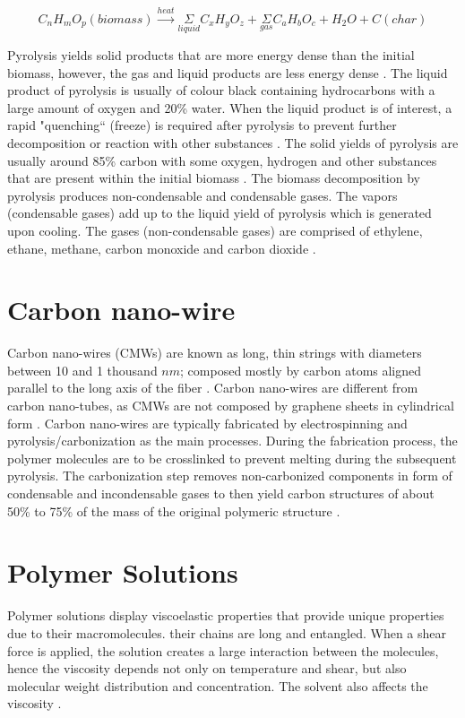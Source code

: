 \begin{equation}
C_{n} H_{m} O_{p} (biomass) \overset{heat}{\rightarrow} \underset{liquid}{\Sigma} C_{x} H_{y} O_{z} + \underset{gas}{\Sigma} C_{a} H_{b} O_{c} + H_{2} O + C (char)
\label{eq:genPyrolysis}
\end{equation}

Pyrolysis yields solid products that are more energy dense than the initial biomass, however, the gas and liquid products are less energy dense \cite{Basu2018}. The liquid product of pyrolysis is usually of colour black containing hydrocarbons with a large amount of oxygen and 20\% water. When the liquid product is of interest, a rapid "quenching`` (freeze) is required after pyrolysis to prevent further decomposition or reaction with other substances \cite{Basu2018}. The solid yields of pyrolysis are usually around 85\% carbon with some oxygen, hydrogen and other substances that are present within the initial biomass \cite{Basu2018}. The biomass decomposition by pyrolysis produces non-condensable and condensable gases. The vapors (condensable gases) add up to the liquid yield of pyrolysis which is generated upon cooling. The gases (non-condensable gases) are comprised of ethylene, ethane, methane, carbon monoxide and carbon dioxide \cite{Basu2018}.

\section{Carbon nano-wire}
Carbon nano-wires (CMWs) are known as long, thin strings with diameters between 10 and 1 thousand $n m$; composed mostly by carbon atoms aligned parallel to the long axis of the fiber \cite{Nataraj2012}. Carbon nano-wires are different from carbon nano-tubes, as CMWs are not composed by graphene sheets in cylindrical form \cite{Nataraj2012}. Carbon nano-wires are typically fabricated by electrospinning and pyrolysis/carbonization as the main processes. During the fabrication process, the polymer molecules are to be crosslinked to prevent melting during the subsequent pyrolysis. The carbonization step removes non-carbonized components in form of condensable and incondensable gases \cite{Basu2018} to then yield carbon structures of about 50\% to 75\% of the mass of the original polymeric structure \cite{Nataraj2012}.

\section{Polymer Solutions}
Polymer solutions display viscoelastic properties that provide unique properties due to their macromolecules. their chains are long and entangled. When a shear force is applied, the solution creates a large interaction between the molecules, hence the viscosity depends not only on temperature and shear, but also molecular weight distribution and concentration. The solvent also affects the viscosity \cite{Flores2017, Huang2003, Baumgarten1971}.

